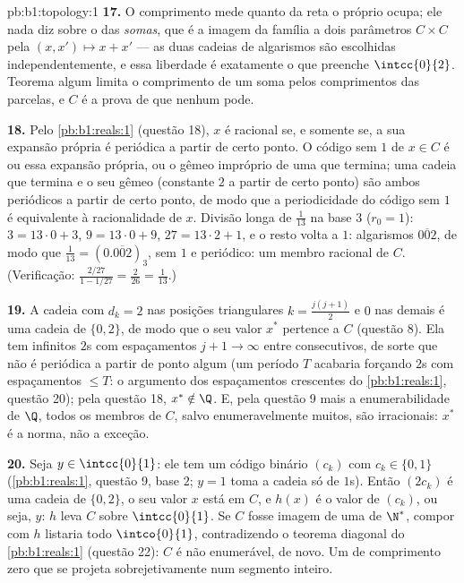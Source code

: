 \begin{solution}{pb:b1:topology:1}
\textbf{17.} O comprimento mede quanto da reta o próprio 
ocupa; ele nada diz sobre o  das \emph{somas}, que é
a imagem da família a dois parâmetros $C \times C$ pela  $(x,
x') \mapsto x + x'$ --- as duas cadeias de algarismos são escolhidas
independentemente, e essa liberdade é exatamente o que preenche
$\intcc{0}{2}$. Teorema algum limita o comprimento de um  soma
pelos comprimentos das parcelas, e $C$ é a prova de que nenhum pode.

\textbf{18.} Pelo \cref{pb:b1:reals:1} (questão 18), $x$ é
racional se, e somente se, a sua expansão própria é periódica a partir
de certo ponto. O código sem $1$ de $x \in C$ é ou essa expansão
própria, ou o gêmeo impróprio de uma que termina; uma cadeia que termina
e o seu gêmeo (constante $2$ a partir de certo ponto) são ambos
periódicos a partir de certo ponto, de modo que a periodicidade do
código sem $1$ é equivalente à racionalidade de $x$. Divisão longa de
$\frac1{13}$ na base $3$ ($r_0 = 1$): $3 = 13\cdot0 + 3$, $9 = 13\cdot0 + 9$, $27 =
13\cdot2 + 1$, e o resto volta a $1$: algarismos
$\overline{002}$, de modo que $\frac1{13} = (0.\overline{002})_3$,
sem $1$ e periódico: um membro racional de $C$. (Verificação:
$\frac{2/27}{1 - 1/27} = \frac{2}{26} = \frac1{13}$.)

\textbf{19.} A cadeia com $d_k = 2$ nas posições triangulares
$k = \frac{j(j+1)}{2}$ e $0$ nas demais é uma cadeia de
$\{0,2\}$, de modo que o seu valor $x^*$ pertence a $C$ (questão
8). Ela tem infinitos $2$s com espaçamentos $j + 1 \to \infty$
entre consecutivos, de sorte que não é periódica a partir de ponto algum
(um período $T$ acabaria forçando $2$s com espaçamentos $\leq T$: o
argumento dos espaçamentos crescentes do \cref{pb:b1:reals:1}, questão 20); pela
questão 18, $x^* \notin \Q$. E, pela questão 9 mais a
enumerabilidade de $\Q$, todos os membros de $C$, salvo enumeravelmente
muitos, são irracionais: $x^*$ é a norma, não a exceção.

\textbf{20.} Seja $y \in \intcc{0}{1}$: ele tem um código binário
$(c_k)$ com $c_k \in \{0, 1\}$ (\cref{pb:b1:reals:1}, questão
9, base $2$; $y = 1$ toma a cadeia só de $1$s). Então $(2c_k)$
é uma cadeia de $\{0,2\}$, o seu valor $x$ está em $C$, e $h(x)$ é
o valor de $(c_k)$, ou seja, $y$: $h$ leva $C$ sobre
$\intcc{0}{1}$. Se $C$ fosse imagem de uma  de $\N^*$,
compor com $h$ listaria todo $\intco{0}{1}$,
contradizendo o teorema diagonal do \cref{pb:b1:reals:1}
(questão 22): $C$ é não enumerável, de novo. Um  de comprimento
zero que se projeta sobrejetivamente num segmento inteiro.


\end{solution}

